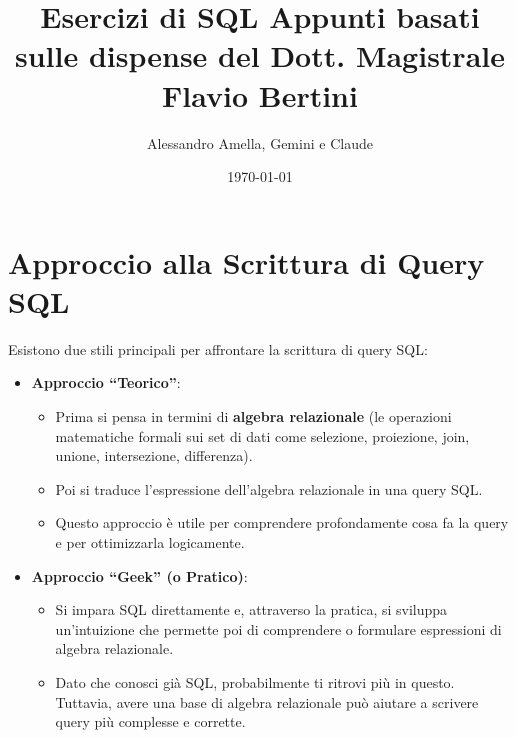 

\usepackage{hyperref}

\title{Esercizi di SQL
  \large Appunti basati sulle dispense del Dott. Magistrale Flavio Bertini}
\author{Alessandro Amella, Gemini e Claude}
\date{\today}



\maketitle
\tableofcontents
\newpage

\section{Approccio alla Scrittura di Query SQL}

Esistono due stili principali per affrontare la scrittura di query SQL:

\begin{itemize}
    \item \textbf{Approccio ``Teorico''}:
    \begin{itemize}
        \item Prima si pensa in termini di \textbf{algebra relazionale} (le operazioni matematiche formali sui set di dati come selezione, proiezione, join, unione, intersezione, differenza).
        \item Poi si traduce l'espressione dell'algebra relazionale in una query SQL.
        \item Questo approccio è utile per comprendere profondamente cosa fa la query e per ottimizzarla logicamente.
    \end{itemize}

    \item \textbf{Approccio ``Geek'' (o Pratico)}:
    \begin{itemize}
        \item Si impara SQL direttamente e, attraverso la pratica, si sviluppa un'intuizione che permette poi di comprendere o formulare espressioni di algebra relazionale.
        \item Dato che conosci già SQL, probabilmente ti ritrovi più in questo. Tuttavia, avere una base di algebra relazionale può aiutare a scrivere query più complesse e corrette.
    \end{itemize}
\end{itemize}


